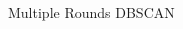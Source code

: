 \documentclass{article}
\begin{document}
\begin{CJK}{UTF8}{gbsn}
\begin{figure}[!h]
\begin{minipage}[c]{0.5\textwidth}
		\vfill
		\hspace{0.01\linewidth}
		
		\caption{Multiple Rounds DBSCAN}
		\label{fig:subfig}
	\end{minipage} 
\end{figure}




\end{CJK}
\end{document}
